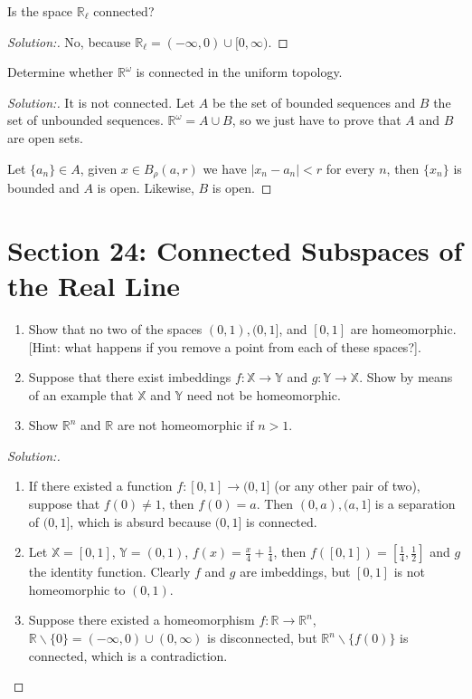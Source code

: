 \documentclass[a4paper,12pt, reqno]{article}
\theoremstyle{definition}
\newenvironment{exerr}[1]{
  \renewcommand\theexeralt{#1}
  \exeralt
}{\endexeralt}
\newenvironment{solution}{\begin{proof}[Solution:]}{\end{proof}}
\newcommand{\R}{\mathbb{R}}
\newcommand{\X}{\mathbb{X}}
\newcommand{\Y}{\mathbb{Y}}
\begin{document}
\begin{exerr}{7}
  Is the space $\R_{\ell}$ connected?
\end{exerr}
\begin{solution}
  No, because $\R_{\ell} = (-\infty,0)\cup[0,\infty)$.
\end{solution}

\begin{exerr}{8}
  Determine whether $\R^\omega$ is connected in the uniform topology.
\end{exerr}
\begin{solution}
  It is not connected. Let $A$ be the set of bounded sequences and $B$ the set of unbounded sequences. $\R^\omega = A\cup B$, so we just have to prove that $A$ and $B$ are open sets.

  Let $\{ a_{n} \}\in A$, given $x\in B_{\rho}(a,r)$ we have $|x_{n}-a_{n}|<r$ for every $n$, then $\{ x_{n} \}$ is bounded and $A$ is open. Likewise, $B$ is open.
\end{solution}

\section*{Section 24: Connected Subspaces of the Real Line}

\begin{exerr}{1}\hfill
  \begin{enumerate}[label=(\alph*)]
    \item Show that no two of the spaces $(0,1),(0,1]$, and $[0,1]$ are homeomorphic. [Hint: what happens if you remove a point from each of these spaces?].
    \item Suppose that there exist imbeddings $f:\X\to\Y$ and $g:\Y\to\X$. Show by means of an example that $\X$ and $\Y$ need not be homeomorphic.
    \item Show $\R^n$ and $\R$ are not homeomorphic if $n>1$.
  \end{enumerate}
\end{exerr}
\begin{solution}\hfill
  \begin{enumerate}[label=(\alph*)]
    \item If there existed a function $f:[0,1]\to(0,1]$ (or any other pair of two), suppose that $f(0)\neq 1$, then $f(0)=a$. Then $(0,a),(a,1]$ is a separation of $(0,1]$, which is absurd because $(0,1]$ is connected.
    \item Let $\X = [0,1]$, $\Y = (0,1)$, $f(x) = \frac{x}{4}+\frac{1}{4}$, then $f([0,1]) = [\frac{1}{4},\frac{1}{2}]$ and $g$ the identity function. Clearly $f$ and $g$ are imbeddings, but $[0,1]$ is not homeomorphic to $(0,1)$.
    \item Suppose there existed a homeomorphism $f:\R\to\R^n$, $\R\backslash\{ 0 \} = (-\infty,0)\cup(0,\infty)$ is disconnected, but $\R^n\backslash\{ f(0) \}$ is connected, which is a contradiction.
  \end{enumerate}
\end{solution}
\end{document}

